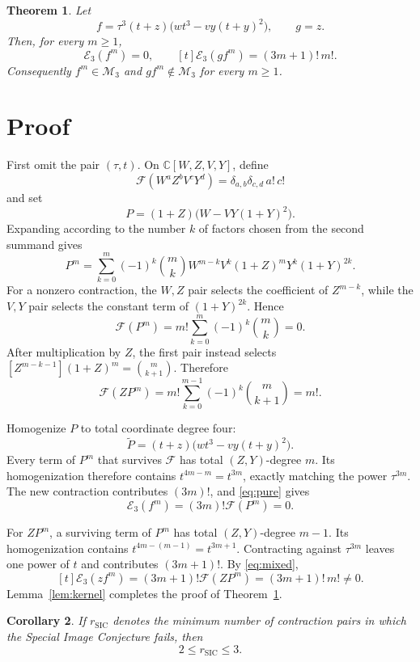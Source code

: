 \documentclass[11pt]{article}
\newtheorem{theorem}{Theorem}
\newtheorem{corollary}[theorem]{Corollary}
\newcommand{\C}{\mathbb C}
\newcommand{\Eop}{\mathcal E}
\newcommand{\M}{\mathcal M}
\begin{document}
\begin{theorem}\label{thm:main}
Let
\[
 \boxed{\quad
 f=\tau^3(t+z)\bigl(wt^3-vy(t+y)^2\bigr),\qquad g=z.
 \quad}
\]
Then, for every \(m\geq1\),
\[
 \Eop_3(f^m)=0,\qquad
 [t]\Eop_3(gf^m)=(3m+1)!\,m!.
\]
Consequently \(f^m\in\M_3\) and \(gf^m\notin\M_3\) for every
\(m\geq1\).
\end{theorem}

\section{Proof}

First omit the pair \((\tau,t)\).  On
\(\C[W,Z,V,Y]\), define
\[
 \mathcal F(W^aZ^bV^cY^d)
 =\delta_{a,b}\delta_{c,d}\,a!\,c!
\]
and set
\[
 P=(1+Z)\bigl(W-VY(1+Y)^2\bigr).
\]
Expanding according to the number \(k\) of factors chosen from the
second summand gives
\[
 P^m=\sum_{k=0}^m(-1)^k\binom mk
 W^{m-k}V^k(1+Z)^mY^k(1+Y)^{2k}.
\]
For a nonzero contraction, the \(W,Z\) pair selects the coefficient
of \(Z^{m-k}\), while the \(V,Y\) pair selects the constant term of
\((1+Y)^{2k}\).  Hence
\begin{equation}\label{eq:pure}
 \mathcal F(P^m)
 =m!\sum_{k=0}^m(-1)^k\binom mk=0.
\end{equation}
After multiplication by \(Z\), the first pair instead selects
\([Z^{m-k-1}](1+Z)^m=\binom m{k+1}\).  Therefore
\begin{equation}\label{eq:mixed}
 \mathcal F(ZP^m)
 =m!\sum_{k=0}^{m-1}(-1)^k\binom m{k+1}=m!.
\end{equation}

Homogenize \(P\) to total coordinate degree four:
\[
 \widetilde P
 =(t+z)\bigl(wt^3-vy(t+y)^2\bigr).
\]
Every term of \(P^m\) that survives \(\mathcal F\) has total
\((Z,Y)\)-degree \(m\).  Its homogenization therefore contains
\(t^{4m-m}=t^{3m}\), exactly matching the power \(\tau^{3m}\).
The new contraction contributes \((3m)!\), and
\eqref{eq:pure} gives
\[
 \Eop_3(f^m)=(3m)!\mathcal F(P^m)=0.
\]

For \(ZP^m\), a surviving term of \(P^m\) has total
\((Z,Y)\)-degree \(m-1\).  Its homogenization contains
\(t^{4m-(m-1)}=t^{3m+1}\).  Contracting against \(\tau^{3m}\)
leaves one power of \(t\) and contributes \((3m+1)!\).  By
\eqref{eq:mixed},
\[
 [t]\Eop_3(zf^m)
 =(3m+1)!\mathcal F(ZP^m)
 =(3m+1)!\,m!\neq0.
\]
Lemma~\ref{lem:kernel} completes the proof of
Theorem~\ref{thm:main}.

\begin{corollary}
If \(r_{\mathrm{SIC}}\) denotes the minimum number of contraction pairs
in which the Special Image Conjecture fails, then
\[
 2\leq r_{\mathrm{SIC}}\leq3.
\]
\end{corollary}
\end{document}

